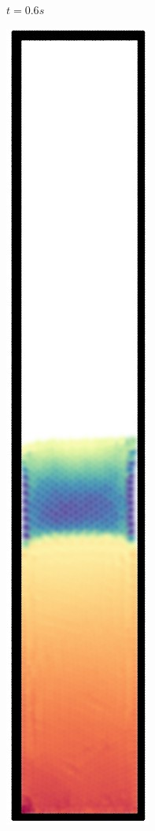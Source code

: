 \begin{figure}[h]
\begin{subfigure}[t]{0.09\textwidth}
    \caption{\small{$t=0.6s$}}
  \end{subfigure}%
  \begin{subfigure}[t]{0.09\textwidth}
    \includegraphics[width=\textwidth]{images/oscillate/070.jpg}

\end{subfigure}
\end{figure}
